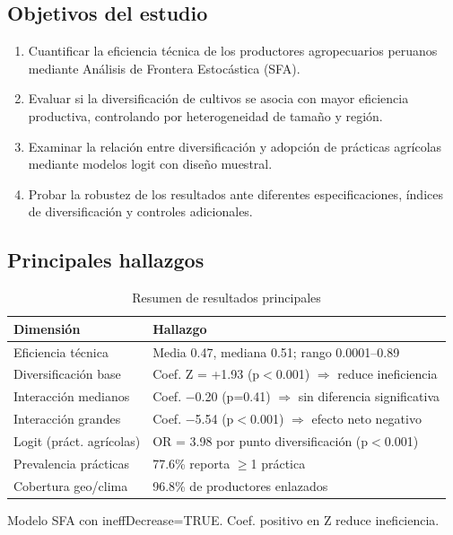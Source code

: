 \documentclass[11pt,a4paper]{article}
\begin{document}
\subsection{Objetivos del estudio}
\begin{enumerate}[leftmargin=*]
    \item Cuantificar la eficiencia técnica de los productores agropecuarios peruanos mediante Análisis de Frontera Estocástica (SFA).
    \item Evaluar si la diversificación de cultivos se asocia con mayor eficiencia productiva, controlando por heterogeneidad de tamaño y región.
    \item Examinar la relación entre diversificación y adopción de prácticas agrícolas mediante modelos logit con diseño muestral.
    \item Probar la robustez de los resultados ante diferentes especificaciones, índices de diversificación y controles adicionales.
\end{enumerate}

\subsection{Principales hallazgos}

\begin{table}[H]
\centering
\caption{Resumen de resultados principales}
\label{tab:key_findings}
\begin{threeparttable}
\small
\begin{tabular}{p{4cm}p{9cm}}
\toprule
\textbf{Dimensión} & \textbf{Hallazgo} \\
\midrule
Eficiencia técnica & Media 0.47, mediana 0.51; rango 0.0001--0.89 \\
Diversificación base & Coef. Z = +1.93 (p$<$0.001) $\Rightarrow$ reduce ineficiencia \\
Interacción medianos & Coef. $-$0.20 (p=0.41) $\Rightarrow$ sin diferencia significativa \\
Interacción grandes & Coef. $-$5.54 (p$<$0.001) $\Rightarrow$ efecto neto negativo \\
Logit (práct. agrícolas) & OR = 3.98 por punto diversificación (p$<$0.001) \\
Prevalencia prácticas & 77.6\% reporta $\geq$1 práctica \\
Cobertura geo/clima & 96.8\% de productores enlazados \\
\bottomrule
\end{tabular}
\begin{tablenotes}
\footnotesize
\item Modelo SFA con ineffDecrease=TRUE. Coef. positivo en Z reduce ineficiencia.
\end{tablenotes}
\end{threeparttable}
\end{table}
\end{document}

